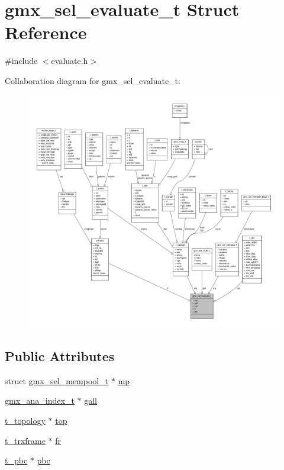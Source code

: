 \hypertarget{structgmx__sel__evaluate__t}{\section{gmx\-\_\-sel\-\_\-evaluate\-\_\-t \-Struct \-Reference}
\label{structgmx__sel__evaluate__t}
}


{\ttfamily \#include $<$evaluate.\-h$>$}



\-Collaboration diagram for gmx\-\_\-sel\-\_\-evaluate\-\_\-t\-:
\nopagebreak
\begin{figure}[H]
\begin{center}
\leavevmode
\includegraphics[width=350pt]{structgmx__sel__evaluate__t__coll__graph}
\end{center}
\end{figure}
\subsection*{\-Public \-Attributes}
\begin{DoxyCompactItemize}
\item 
struct \hyperlink{structgmx__sel__mempool__t}{gmx\-\_\-sel\-\_\-mempool\-\_\-t} $\ast$ \hyperlink{structgmx__sel__evaluate__t_a69c8a62791c3ae6ddfb0e0a9863c2077}{mp}
\item 
\hyperlink{structgmx__ana__index__t}{gmx\-\_\-ana\-\_\-index\-\_\-t} $\ast$ \hyperlink{structgmx__sel__evaluate__t_ad31bc09d5d4da61e315dfade58657180}{gall}
\item 
\hyperlink{structt__topology}{t\-\_\-topology} $\ast$ \hyperlink{structgmx__sel__evaluate__t_ab7bbf1e19ee0c03e5adfb79f0cb4f234}{top}
\item 
\hyperlink{include_2types_2trx_8h_a206f77137d72a5db1097a457a7144ad5}{t\-\_\-trxframe} $\ast$ \hyperlink{structgmx__sel__evaluate__t_a42a5d14474c3e7a66eca0c9663476846}{fr}
\item 
\hyperlink{structt__pbc}{t\-\_\-pbc} $\ast$ \hyperlink{structgmx__sel__evaluate__t_ad45dbdc326186b045973ef3ba68bf677}{pbc}
\end{DoxyCompactItemize}


